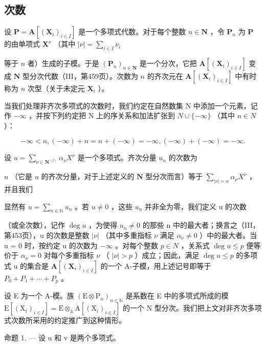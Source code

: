 \subsection{次数}

设 \(\mathbf{P} = \mathbf{A}[(\mathbf{X}_i)_{i\in I}]\) 是一个多项式代数。对于每个整数 \(n\in \mathbf{N}\) ，令 \(\mathbf{P}_n\) 为 \(\mathbf{P}\) 的由单项式 \(\mathbf{X}^{\nu}\) （其中 \(|\nu| = \sum_{i\in I}\nu_i\)

等于 \(n\) 者）生成的子模。于是 \((\mathbf{P}_n)_{n \in \mathbf{N}}\) 是一个分次，它把 \(\mathbf{A}[(\mathbf{X}_i)_{i \in I}]\) 变成 \(\mathbf{N}\) 型分次代数（III，第459页）。次数为 \(n\) 的齐次元在 \(\mathbf{A}[(\mathbf{X}_i)_{i \in I}]\) 中有时称为 \(n\) 次型（关于未定元 \(\mathbf{X}_i\) ）。

当我们处理非齐次多项式的次数时，我们约定在自然数集 N 中添加一个元素，记作 \(-\infty\) ，并按下列约定把 N 上的序关系和加法扩张到 \(N \cup \{-\infty\}\) （其中 \(n \in N\) ）：

\[
- \infty <   n, (- \infty) + n = n + (- \infty) = - \infty , (- \infty) + (- \infty) = - \infty .
\]

设 \(u = \sum_{\nu \in \mathbf{N}^{(I)}} \alpha_{\nu} X^{\nu}\) 是一个多项式。齐次分量 \(u_{n}\) 的次数为

\(n\) （它是 \(u\) 的齐次分量，对于上述定义的 \(\mathbf{N}\) 型分次而言）等于 \(\sum_{|\nu| = n} \alpha_{\nu} X^{\nu}\) ，并且我们

显然有 \(u = \sum_{n \in \mathbb{N}} u_n\) 。若 \(u \neq 0\) ，这些 \(u_n\) 并非全为零，我们定义 u 的次数

（或全次数），记作 \(\deg u\) ，为使得 \(u_{n} \neq 0\) 的那些 n 中的最大者；换言之（III，第453页），u 的次数是整数 \(|\nu|\) （其中多重指标 \(\nu\) 满足 \(\alpha_{\nu} \neq 0\) ）中的最大者。当 u = 0 时，按约定 u 的次数为 \(-\infty\) 。对每个整数 \(p \in N\) ，关系式 \(\deg u \leqslant p\) 便等价于 \(\alpha_{\nu} = 0\) 对每个多重指标 \(\nu\) （ \(|\nu| > p\) ）成立；因此，满足 \(\deg u \leqslant p\) 的多项式 u 的集合是 \(\mathbf{A}[(\mathbf{X}_{i})_{i \in I}]\) 的一个 A-子模，用上述记号即等于 \(P_{0} + P_{1} + \cdots + P_{p}\) 。

设 E 为一个 A-模。族 \((\mathrm{E} \otimes \mathrm{P}_{n})_{n \in \mathbb{N}}\) 是系数在 E 中的多项式所成的模 \(\mathrm{E}[(\mathrm{X}_{i})_{i \in I}] = \mathrm{E} \otimes_{\mathbb{A}} \mathrm{A}[(\mathrm{X}_{i})_{i \in I}]\) 的一个 N 型分次。我们把上文对非齐次多项式次数所采用的约定推广到这种情形。

命题 1. --- 设 u 和 v 是两个多项式。

